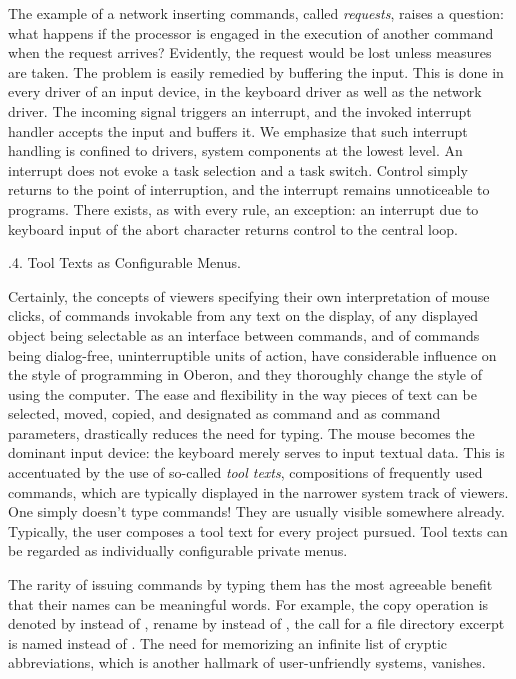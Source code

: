 The example of a network inserting commands, called \emph{requests}, raises a
question: what happens if the processor is engaged in the execution of
another command when the request arrives? Evidently, the request would
be lost unless measures are taken. The problem is easily remedied by
buffering the input. This is done in every driver of an input device,
in the keyboard driver as well as the network driver. The incoming
signal triggers an interrupt, and the invoked interrupt handler
accepts the input and buffers it. We emphasize that such interrupt
handling is confined to drivers, system components at the lowest
level. An interrupt does not evoke a task selection and a task
switch. Control simply returns to the point of interruption, and the
interrupt remains unnoticeable to programs. There exists, as with
every rule, an exception: an interrupt due to keyboard input of the
abort character returns control to the central loop.

.4. Tool Texts as Configurable Menus.

Certainly, the concepts of viewers specifying their own interpretation
of mouse clicks, of commands invokable from any text on the display,
of any displayed object being selectable as an interface between
commands, and of commands being dialog-free, uninterruptible units of
action, have considerable influence on the style of programming in
Oberon, and they thoroughly change the style of using the
computer. The ease and flexibility in the way pieces of text can be
selected, moved, copied, and designated as command and as command
parameters, drastically reduces the need for typing. The mouse becomes
the dominant input device: the keyboard merely serves to input textual
data. This is accentuated by the use of so-called \emph{tool texts},
compositions of frequently used commands, which are typically
displayed in the narrower system track of viewers. One simply doesn't
type commands! They are usually visible somewhere already. Typically,
the user composes a tool text for every project pursued. Tool texts
can be regarded as individually configurable private menus.

The rarity of issuing commands by typing them has the most agreeable
benefit that their names can be meaningful words. For example, the
copy operation is denoted by  instead of , rename by 
instead of , the call for a file directory excerpt is named
 instead of . The need for memorizing an infinite list of
cryptic abbreviations, which is another hallmark of user-unfriendly
systems, vanishes.

